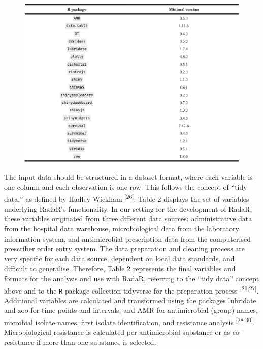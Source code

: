 \documentclass[
]{book}
\begin{document}
\begin{figure}

{\centering \includegraphics[width=1\linewidth]{images/05-t01} 

}

\end{figure}

The input data should be structured in a dataset format, where each variable is one column and each observation is one row. This follows the concept of ``tidy data,'' as defined by Hadley Wickham \textsuperscript{{[}26{]}}. Table 2 displays the set of variables underlying RadaR's functionality. In our setting for the development of RadaR, these variables originated from three different data sources: administrative data from the hospital data warehouse, microbiological data from the laboratory information system, and antimicrobial prescription data from the computerised prescriber order entry system. The data preparation and cleaning process are very specific for each data source, dependent on local data standards, and difficult to generalise. Therefore, Table 2 represents the final variables and formats for the analysis and use with RadaR, referring to the ``tidy data'' concept above and to the \texttt{R} package collection tidyverse for the preparation process \textsuperscript{{[}26,27{]}}. Additional variables are calculated and transformed using the packages lubridate and zoo for time points and intervals, and AMR for antimicrobial (group) names, microbial isolate names, first isolate identification, and resistance analysis \textsuperscript{{[}28-30{]}}. Microbiological resistance is calculated per antimicrobial substance or as co-resistance if more than one substance is selected.
\end{document}
